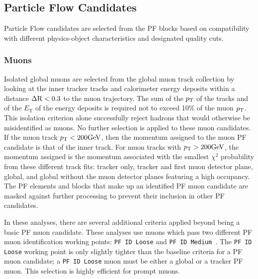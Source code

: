 \subsection{Particle Flow Candidates}
Particle Flow candidates are selected from the PF blocks based on compatibility with
different physics-object characteristics and designated quality cuts.


\subsubsection{Muons}
\label{sec:pf_muons}
Isolated global muons are selected from the global muon track collection by looking at the inner
tracker tracks and calorimeter 
energy deposits within a distance $\Delta \mathrm{R} < 0.3$ to the muon trajectory. 
The sum of the $p_\mathrm{T}$ of the tracks and of the $E_{\text{T}}$ of the energy deposits is required not to 
exceed 10\% of the muon $p_\mathrm{T}$. This isolation criterion alone successfully reject hadrons that would
otherwise be misidentified as muons. No further selection is applied to these muon candidates.
If the muon track $p_\mathrm{T} < 200\mathrm{GeV}$, then the momentum assigned to the muon PF candidate is that of 
the inner track. For muon tracks with $p_\mathrm{T} > 200\mathrm{GeV}$, the momentum assigned is the momentum associated
with the smallest $\chi^2$ probability from these different track fits: tracker only, tracker and 
first muon detector plane, global, and global without the muon detector planes featuring a high occupancy.
The PF elements and blocks that make up an identified PF muon candidate are masked against further processing
to prevent their inclusion in other PF candidates.

In these analyses, there are several additional criteria applied beyond 
being a basic PF muon candidate. These analyses use muons which pass two different PF muon identification working
points: \texttt{PF ID Loose} and \texttt{PF ID Medium}~\cite{sm-htt-2017}. The \texttt{PF ID Loose}
working point is only slightly tighter than the baseline criteria for a PF muon candidate; 
a \texttt{PF ID Loose} muon must be either a global or a tracker PF muon. This selection is highly efficient
for prompt muons.

